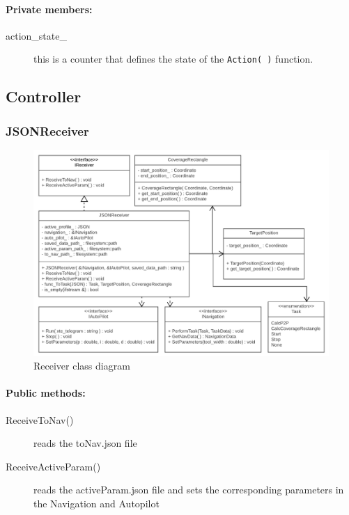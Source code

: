 \paragraph{Private members:}
\begin{adjustwidth}{2.5em}{0pt}\begin{description}
		\item [action_state_] this is a counter that defines the state of the \texttt{Action( )} function.
\end{description}\end{adjustwidth}



\subsection{Controller}

\subsubsection{JSONReceiver}

\begin{figure}[H]
\centering
\includegraphics[width=1\linewidth]{Images/Design/Receiver_class_diagram}
\caption{Receiver class diagram}
\label{fig:Receiver}
\end{figure}

\paragraph{Public methods:}
\begin{adjustwidth}{2.5em}{0pt}\begin{description}
		\item [ReceiveToNav()] reads the toNav.json file
		\item [ReceiveActiveParam()] reads the activeParam.json file and sets the corresponding parameters in the Navigation and Autopilot
\end{description}\end{adjustwidth}

